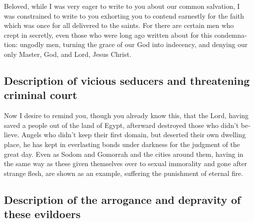 \begin{paracol}{2}
\begin{otherlanguage}{english}
 Beloved, while I was very eager to write to you about our
common salvation, I was constrained to write to you exhorting you to
contend earnestly for the faith which was once for all delivered to the
saints.  For there are certain men who crept in secretly,
even those who were long ago written about for this condemnation:
ungodly men, turning the grace of our God into indecency, and denying
our only Master, God, and Lord, Jesus Christ.

\hypertarget{description-of-vicious-seducers-and-threatening-criminal-court}{%
\subsection{Description of vicious seducers and threatening criminal
court}\label{description-of-vicious-seducers-and-threatening-criminal-court}}

 Now I desire to remind you, though you already know this,
that the Lord, having saved a people out of the land of Egypt, afterward
destroyed those who didn't believe.  Angels who didn't
keep their first domain, but deserted their own dwelling place, he has
kept in everlasting bonds under darkness for the judgment of the great
day.  Even as Sodom and Gomorrah and the cities around
them, having in the same way as these given themselves over to sexual
immorality and gone after strange flesh, are shown as an example,
suffering the punishment of eternal fire.

\hypertarget{description-of-the-arrogance-and-depravity-of-these-evildoers}{%
\subsection{Description of the arrogance and depravity of these
evildoers}\label{description-of-the-arrogance-and-depravity-of-these-evildoers}}


\end{otherlanguage}
\end{paracol}
